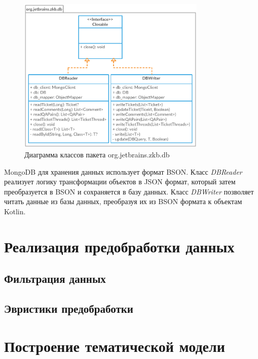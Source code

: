 \begin{figure}[tph!]
\centerline{\includegraphics[width=9cm]{fig/dbmodel.png}}
    \caption{Диаграмма классов пакета org.jetbrains.zkb.db}
    \label{fig:dbdmodel}
\end{figure}


MongoDB для хранения данных использует формат BSON. Класс \textit{DBReader} реализует логику трансформации объектов в JSON формат, который затем преобразуется в BSON и сохраняется в базу данных. Класс \textit{DBWriter} позволяет читать данные из базы данных, преобразуя их из BSON формата к объектам Kotlin.

\section{Реализация предобработки данных}
\subsection{Фильтрация данных}
\subsection{Эвристики предобработки}
\section{Построение тематической модели}
